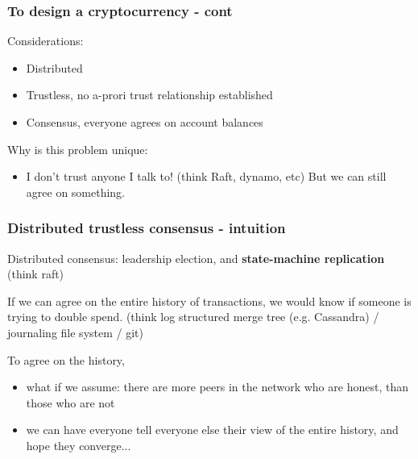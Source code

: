 \documentclass{beamer}
\begin{document}
\begin{frame}
\frametitle{To design a cryptocurrency - cont}

Considerations:
\begin{itemize}
  \item Distributed
  \item Trustless, no a-prori trust relationship established
  \item Consensus, everyone agrees on account balances
\end{itemize}

\vspace{0.3in}
Why is this problem unique:

\begin{itemize}
  \item I don't trust anyone I talk to! (think Raft, dynamo, etc) But we can still agree on something.
\end{itemize}

\end{frame}

\begin{frame}
\frametitle{Distributed trustless consensus - intuition}

Distributed consensus: leadership election, and \textbf{state-machine replication}
(think raft)

\vspace{0.2in}
If we can agree on the entire history of transactions, we would know if someone is trying to double spend.
(think log structured merge tree (e.g. Cassandra) / journaling file system / git)

\vspace{0.2in}
To agree on the history,

\begin{itemize}
  \item what if we assume: there are more peers in the network who are honest, than those who are not
  \item we can have everyone tell everyone else their view of the entire history, and hope they converge...
\end{itemize}

\end{frame}
\end{document}
